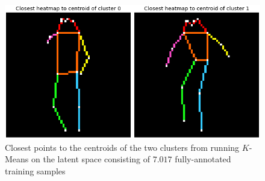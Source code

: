 \documentclass[./main.tex]{subfiles}
\begin{document}
\begin{figure}[b]
    \centering
    \includegraphics[height = 4 cm]{entities/centroids_full_skeletons.png}
    \caption{Closest points to the centroids of the two clusters from running $K$-Means on the latent space consisting of $7.017$ fully-annotated training samples}
    \label{fig:centroids_full}
\end{figure}
\end{document}
